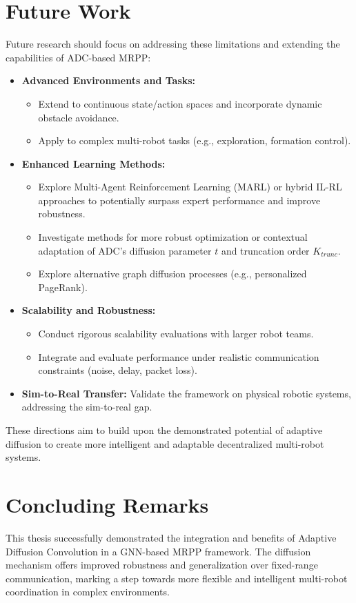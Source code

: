 \section{Future Work}
Future research should focus on addressing these limitations and extending the capabilities of ADC-based MRPP:
\begin{itemize}
    \item \textbf{Advanced Environments and Tasks:}
        \begin{itemize}
            \item Extend to continuous state/action spaces and incorporate dynamic obstacle avoidance.
            \item Apply to complex multi-robot tasks (e.g., exploration, formation control).
        \end{itemize}
    \item \textbf{Enhanced Learning Methods:}
        \begin{itemize}
            \item Explore Multi-Agent Reinforcement Learning (MARL) or hybrid IL-RL approaches to potentially surpass expert performance and improve robustness.
            \item Investigate methods for more robust optimization or contextual adaptation of ADC's diffusion parameter $t$ and truncation order $K_{trunc}$.
            \item Explore alternative graph diffusion processes (e.g., personalized PageRank).
        \end{itemize}
    \item \textbf{Scalability and Robustness:}
        \begin{itemize}
            \item Conduct rigorous scalability evaluations with larger robot teams.
            \item Integrate and evaluate performance under realistic communication constraints (noise, delay, packet loss).
        \end{itemize}
    \item \textbf{Sim-to-Real Transfer:} Validate the framework on physical robotic systems, addressing the sim-to-real gap.
\end{itemize}
These directions aim to build upon the demonstrated potential of adaptive diffusion to create more intelligent and adaptable decentralized multi-robot systems.

\section{Concluding Remarks}
This thesis successfully demonstrated the integration and benefits of Adaptive Diffusion Convolution in a GNN-based MRPP framework. The diffusion mechanism offers improved robustness and generalization over fixed-range communication, marking a step towards more flexible and intelligent multi-robot coordination in complex environments.
